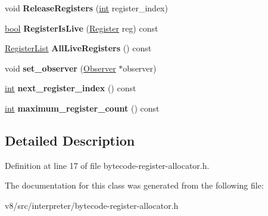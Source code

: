 \begin{DoxyCompactItemize}
void {\bfseries Release\+Registers} (\mbox{\hyperlink{classint}{int}} register\+\_\+index)
\item 
\mbox{\label{classv8_1_1internal_1_1interpreter_1_1BytecodeRegisterAllocator_a0bc56ab130525071cd03980110eac9cc}} 
\mbox{\hyperlink{classbool}{bool}} {\bfseries Register\+Is\+Live} (\mbox{\hyperlink{classv8_1_1internal_1_1interpreter_1_1Register}{Register}} reg) const
\item 
\mbox{\label{classv8_1_1internal_1_1interpreter_1_1BytecodeRegisterAllocator_a2087253e4b96aad48722e7dc6a985e4b}} 
\mbox{\hyperlink{classv8_1_1internal_1_1interpreter_1_1RegisterList}{Register\+List}} {\bfseries All\+Live\+Registers} () const
\item 
\mbox{\label{classv8_1_1internal_1_1interpreter_1_1BytecodeRegisterAllocator_abcd4a8405ef4a920eddc496e05644b20}} 
void {\bfseries set\+\_\+observer} (\mbox{\hyperlink{classv8_1_1internal_1_1interpreter_1_1BytecodeRegisterAllocator_1_1Observer}{Observer}} $\ast$observer)
\item 
\mbox{\label{classv8_1_1internal_1_1interpreter_1_1BytecodeRegisterAllocator_aa472152914721a6a18e1b55cb2c2cd80}} 
\mbox{\hyperlink{classint}{int}} {\bfseries next\+\_\+register\+\_\+index} () const
\item 
\mbox{\label{classv8_1_1internal_1_1interpreter_1_1BytecodeRegisterAllocator_a89179712a755d485133b82e33ec21a8c}} 
\mbox{\hyperlink{classint}{int}} {\bfseries maximum\+\_\+register\+\_\+count} () const
\end{DoxyCompactItemize}


\subsection{Detailed Description}


Definition at line 17 of file bytecode-\/register-\/allocator.\+h.



The documentation for this class was generated from the following file\+:\begin{DoxyCompactItemize}
\item 
v8/src/interpreter/bytecode-\/register-\/allocator.\+h\end{DoxyCompactItemize}
